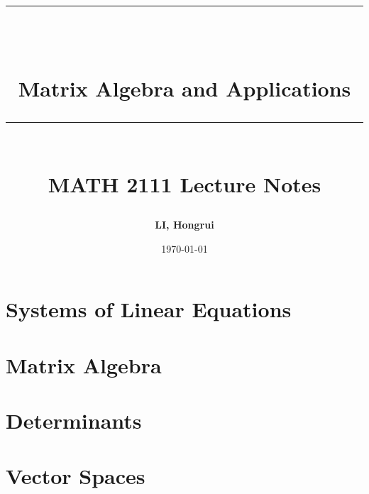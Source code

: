 \documentclass[10pt, a4paper]{article}
\newcommand{\HRule}[1]{\rule{\linewidth}{#1}}
\begin{document}
\title{ \normalsize \textsc{}
\\ [2.0cm]
\HRule{1.5pt} \\ [0.3cm]
\LARGE {\textbf{Matrix Algebra and Applications}
\HRule{1.5pt} \\ [0.6cm]
\LARGE{\textbf{MATH 2111 Lecture Notes}} \vspace*{10\baselineskip}}
}
\date{\today}
\author{\textbf{LI, Hongrui}}  %
\maketitle

\clearpage
\tableofcontents
\newpage


\section{Systems of Linear Equations}
\section{Matrix Algebra}
\section{Determinants}
\newpage



\section{Vector Spaces}
\end{document}
